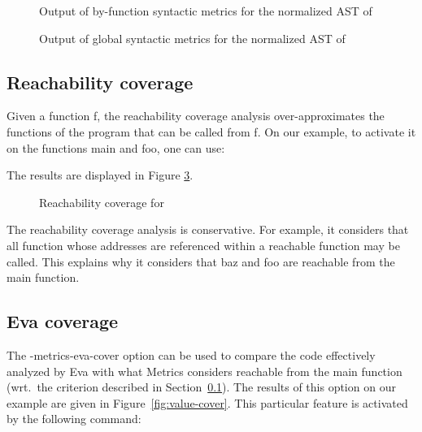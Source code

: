 \documentclass{frama-c-book}
\begin{document}
\begin{figure}[!ht]
  \centering
  
  \caption{Output of by-function syntactic metrics for the normalized AST of \pgname}
  \label{fig:cprog_output}
\end{figure}

\begin{figure}[!ht]
  \centering
  
  \caption{Output of global syntactic metrics for the normalized AST of \pgname}
  \label{fig:cprog_output2}
\end{figure}


\subsection{Reachability coverage}
\label{sec:analysis-cover}

Given a function {\sf f}, the reachability coverage analysis over-approximates
the functions of the program that can be called from {\sf f}.
On our example, to activate it on the functions {\sf main} and {\sf foo},
one can use:
\begin{shell}[escapechar={\#}]
\end{shell}

The results are displayed in Figure \ref{fig:reach_cover}.
\begin{figure}[!ht]
  \centering
  
  \caption{Reachability coverage for \pgname}
  \label{fig:reach_cover}
\end{figure}
The reachability coverage analysis is conservative. For example, it
considers that all function whose addresses are referenced within a
reachable function may be called. This explains why it considers that {\sf baz}
and {\sf foo} are reachable from the {\sf main} function.



\subsection{Eva coverage}
\label{sec:eva-cover}

The {\sf -metrics-eva-cover} option can be used to compare the code
effectively analyzed by Eva with what {\sf Metrics}
considers reachable from the {\sf main} function (wrt.\ the criterion
described in Section~\ref{sec:analysis-cover}).  The results of this option on our
example are given in Figure~\ref{fig:value-cover}. This particular
feature is activated by the following command:
\end{document}
